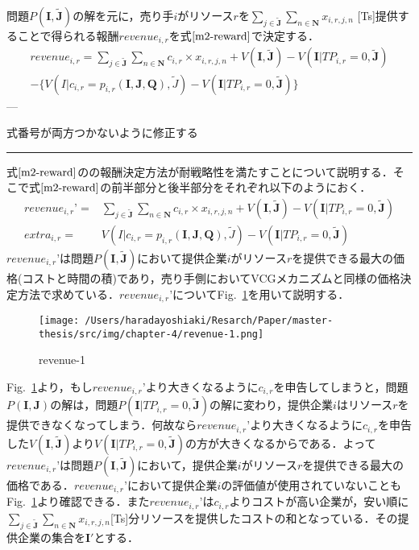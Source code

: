 問題\(P(\boldsymbol{I},\boldsymbol{\tilde{J}})\)の解を元に，売り手\(i\)がリソース\(r\)を\(\sum_{j\in\boldsymbol{\tilde{J}}}\sum_{n\in\boldsymbol{N}}x_{i,r,j,n}\)
{[}Ts{]}提供することで得られる報酬\(revenue_{i,r}\)を式\(\eqref{m2-reward}\)で決定する．
\begin{align}
revenue_{i,r}=\sum_{j\in\boldsymbol{\tilde{J}}}\sum_{n\in\boldsymbol{N}}c_{i,r} \times x_{i,r,j,n} +V(\boldsymbol{I},\boldsymbol{\tilde{J}})-V(\boldsymbol{I}|TP_{i,r}=0,\boldsymbol{\tilde{J}})\\-\{V(I|c_{i,r}=p_{i,r}(\boldsymbol{I},\boldsymbol{J},\boldsymbol{Q}),\tilde{J})-  V(\boldsymbol{I}|TP_{i,r}=0,\boldsymbol{\tilde{J}})\}
\label{m2-reward}
\end{align} ---

式番号が両方つかないように修正する

\begin{center}\rule{1.0\linewidth}{0.5pt}\end{center}

式\(\eqref{m2-reward}\)のの報酬決定方法が耐戦略性を満たすことについて説明する．そこで式\(\eqref{m2-reward}\)の前半部分と後半部分をそれぞれ以下のようにおく．
\begin{align}
revenue_{i,r}’=&\sum_{j\in\boldsymbol{\tilde{J}}}\sum_{n\in\boldsymbol{N}}c_{i,r} \times x_{i,r,j,n} +V(\boldsymbol{I},\boldsymbol{\tilde{J}})-V(\boldsymbol{I}|TP_{i,r}=0,\boldsymbol{\tilde{J}})\\
extra_{i,r}=&V(I|c_{i,r}=p_{i,r}(\boldsymbol{I},\boldsymbol{J},\boldsymbol{Q}),\tilde{J})-  V(\boldsymbol{I}|TP_{i,r}=0,\boldsymbol{\tilde{J}})
\end{align}
\(revenue_{i,r}’\)は問題\(P(\boldsymbol{I},\boldsymbol{\tilde{J}})\)において提供企業\(i\)がリソース\(r\)を提供できる最大の価格(コストと時間の積)であり，売り手側においてVCGメカニズムと同様の価格決定方法で求めている．\(revenue_{i,r}’\)についてFig.~\ref{fig:m2-revenue-1}を用いて説明する．

\begin{figure}[H]
\hypertarget{fig:m2-revenue-1}{%
\centering
\texttt{[image: /Users/haradayoshiaki/Resarch/Paper/master-thesis/src/img/chapter-4/revenue-1.png]}
\caption{revenue-1}\label{fig:m2-revenue-1}
}
\end{figure}

Fig.~\ref{fig:m2-revenue-1}より，もし\(revenue_{i,r}’\)より大きくなるように\(c_{i,r}\)を申告してしまうと，問題\(P(\boldsymbol{I},\boldsymbol{J})\)の解は，問題\(P(\boldsymbol{I}|TP_{i,r}=0,\boldsymbol{\tilde{J}})\)の解に変わり，提供企業\(i\)はリソース\(r\)を提供できなくなってしまう．何故なら\(revenue_{i,r}’\)より大きくなるように\(c_{i,r}\)を申告した\(V(\boldsymbol{I},\boldsymbol{\tilde{J}})\)より\(V(\boldsymbol{I}|TP_{i,r}=0,\boldsymbol{\tilde{J}})\)の方が大きくなるからである．よって\(revenue_{i,r}’\)は問題\(P(\boldsymbol{I},\boldsymbol{\tilde{J}})\)において，提供企業\(i\)がリソース\(r\)を提供できる最大の価格である．\(revenue_{i,r}’\)において提供企業\(i\)の評価値が使用されていないこともFig.~\ref{fig:m2-revenue-1}より確認できる．また\(revenue_{i,r}’\)は\(c_{i,r}\)よりコストが高い企業が，安い順に\(\sum_{j\in\boldsymbol{\tilde{J}}}\sum_{n\in\boldsymbol{N}} x_{i,r,j,n}\){[}Ts{]}分リソースを提供したコストの和となっている．その提供企業の集合を\(\boldsymbol{I'}\)とする．

